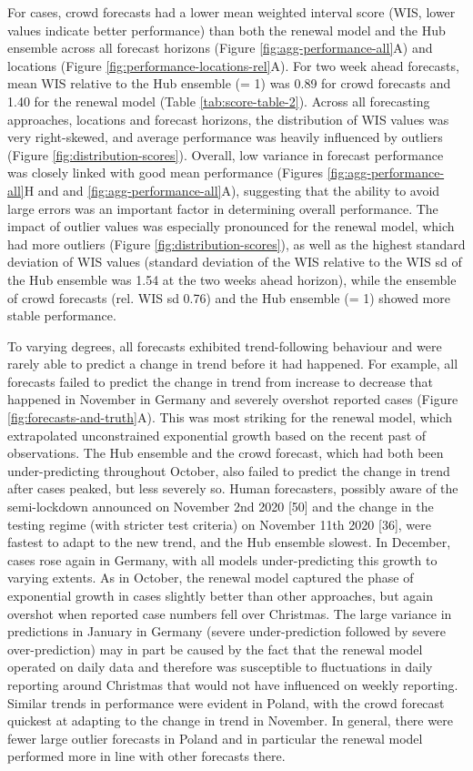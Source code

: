 \documentclass[10pt,letterpaper]{article}
\begin{document}
For cases, crowd forecasts had a lower mean weighted interval score
(WIS, lower values indicate better performance) than both the renewal
model and the Hub ensemble across all forecast horizons (Figure
\ref{fig:agg-performance-all}A) and locations (Figure
\ref{fig:performance-locations-rel}A). For two week ahead forecasts,
mean WIS relative to the Hub ensemble (= 1) was 0.89 for crowd forecasts
and 1.40 for the renewal model (Table \ref{tab:score-table-2}). Across
all forecasting approaches, locations and forecast horizons, the
distribution of WIS values was very right-skewed, and average
performance was heavily influenced by outliers (Figure
\ref{fig:distribution-scores}). Overall, low variance in forecast
performance was closely linked with good mean performance (Figures
\ref{fig:agg-performance-all}H and and \ref{fig:agg-performance-all}A),
suggesting that the ability to avoid large errors was an important
factor in determining overall performance. The impact of outlier values
was especially pronounced for the renewal model, which had more outliers
(Figure \ref{fig:distribution-scores}), as well as the highest standard
deviation of WIS values (standard deviation of the WIS relative to the
WIS sd of the Hub ensemble was 1.54 at the two weeks ahead horizon),
while the ensemble of crowd forecasts (rel. WIS sd 0.76) and the Hub
ensemble (= 1) showed more stable performance.

To varying degrees, all forecasts exhibited trend-following behaviour
and were rarely able to predict a change in trend before it had
happened. For example, all forecasts failed to predict the change in
trend from increase to decrease that happened in November in Germany and
severely overshot reported cases (Figure
\ref{fig:forecasts-and-truth}A). This was most striking for the renewal
model, which extrapolated unconstrained exponential growth based on the
recent past of observations. The Hub ensemble and the crowd forecast,
which had both been under-predicting throughout October, also failed to
predict the change in trend after cases peaked, but less severely so.
Human forecasters, possibly aware of the semi-lockdown announced on
November 2nd 2020 {[}50{]} and the change in the testing regime (with
stricter test criteria) on November 11th 2020 {[}36{]}, were fastest to
adapt to the new trend, and the Hub ensemble slowest. In December, cases
rose again in Germany, with all models under-predicting this growth to
varying extents. As in October, the renewal model captured the phase of
exponential growth in cases slightly better than other approaches, but
again overshot when reported case numbers fell over Christmas. The large
variance in predictions in January in Germany (severe under-prediction
followed by severe over-prediction) may in part be caused by the fact
that the renewal model operated on daily data and therefore was
susceptible to fluctuations in daily reporting around Christmas that
would not have influenced on weekly reporting. Similar trends in
performance were evident in Poland, with the crowd forecast quickest at
adapting to the change in trend in November. In general, there were
fewer large outlier forecasts in Poland and in particular the renewal
model performed more in line with other forecasts there.
\end{document}
